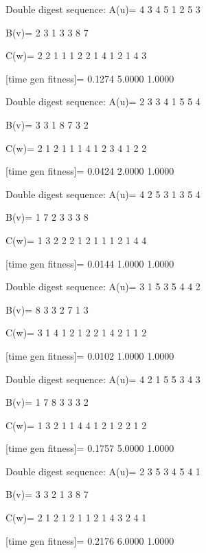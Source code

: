 Double digest sequence:
A(u)=
     4     3     4     5     1     2     5     3

B(v)=
     2     3     1     3     3     8     7

C(w)=
     2     2     1     1     1     2     2     1     4     1     2     1     4     3

[time gen fitness]=
    0.1274    5.0000    1.0000

Double digest sequence:
A(u)=
     2     3     3     4     1     5     5     4

B(v)=
     3     3     1     8     7     3     2

C(w)=
     2     1     2     1     1     1     4     1     2     3     4     1     2     2

[time gen fitness]=
    0.0424    2.0000    1.0000

Double digest sequence:
A(u)=
     4     2     5     3     1     3     5     4

B(v)=
     1     7     2     3     3     3     8

C(w)=
     1     3     2     2     2     1     2     1     1     1     2     1     4     4

[time gen fitness]=
    0.0144    1.0000    1.0000

Double digest sequence:
A(u)=
     3     1     5     3     5     4     4     2

B(v)=
     8     3     3     2     7     1     3

C(w)=
     3     1     4     1     2     1     2     2     1     4     2     1     1     2

[time gen fitness]=
    0.0102    1.0000    1.0000

Double digest sequence:
A(u)=
     4     2     1     5     5     3     4     3

B(v)=
     1     7     8     3     3     3     2

C(w)=
     1     3     2     1     1     4     4     1     2     1     2     2     1     2

[time gen fitness]=
    0.1757    5.0000    1.0000

Double digest sequence:
A(u)=
     2     3     5     3     4     5     4     1

B(v)=
     3     3     2     1     3     8     7

C(w)=
     2     1     2     1     2     1     1     2     1     4     3     2     4     1

[time gen fitness]=
    0.2176    6.0000    1.0000

